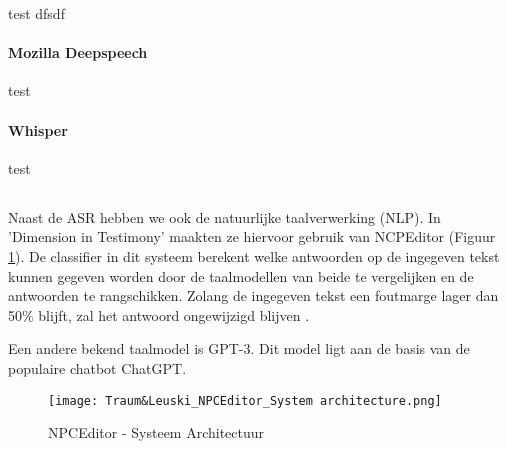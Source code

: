 test dfsdf

\paragraph{Mozilla Deepspeech}%

test

\paragraph{Whisper}%

test

\subsection{} \label{ssec:Natuurlijke taalverwerking}%

Naast de ASR hebben we ook de natuurlijke taalverwerking (NLP). In 'Dimension in Testimony' maakten ze hiervoor gebruik van NCPEditor (Figuur \ref{fig:NPCEArchitecture}). De classifier in dit systeem berekent welke antwoorden op de ingegeven tekst kunnen gegeven worden door de taalmodellen van beide te vergelijken en de antwoorden te rangschikken. Zolang de ingegeven tekst een foutmarge lager dan 50\% blijft, zal het antwoord ongewijzigd blijven \autocite{Leuski2010}.

Een andere bekend taalmodel is GPT-3. Dit model ligt aan de basis van de populaire chatbot ChatGPT.

\begin{figure}[h]
    \centering
    \texttt{[image: Traum\&Leuski\_NPCEditor\_System architecture.png]}
    \caption{NPCEditor - Systeem Architectuur \autocite{Leuski2010}}
    \label{fig:NPCEArchitecture}
\end{figure}

%
%
%
